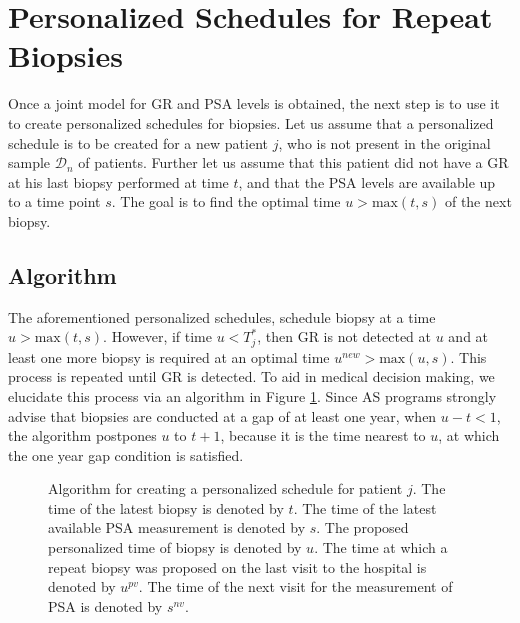 \section{Personalized Schedules for Repeat Biopsies}
\label{sec : pers_sched_approaches}
Once a joint model for GR and PSA levels is obtained, the next step is to use it to create personalized schedules for biopsies. Let us assume that a personalized schedule is to be created for a new patient $j$, who is not present in the original sample $\mathcal{D}_n$ of patients. Further let us assume that this patient did not have a GR at his last biopsy performed at time $t$, and that the PSA levels are available up to a time point $s$. The goal is to find the optimal time $u > \mbox{max}(t,s)$ of the next biopsy. 





\subsection{Algorithm}
\label{subsec : pers_sched_algorithm}
The aforementioned personalized schedules, schedule biopsy at a time $u > \mbox{max}(t,s)$. However, if time $u < T^*_j$, then GR is not detected at $u$ and at least one more biopsy is required at an optimal time $u^{new} > \mbox{max}(u,s)$. This process is repeated until GR is detected. To aid in medical decision making, we elucidate this process via an algorithm in Figure \ref{fig : sched_algorithm}. Since AS programs strongly advise that biopsies are conducted at a gap of at least one year, when $u - t < 1$, the algorithm postpones $u$ to $t + 1$, because it is the time nearest to $u$, at which the one year gap condition is satisfied.


\begin{figure}
\centerline{}
\caption{Algorithm for creating a personalized schedule for patient $j$. The time of the latest biopsy is denoted by $t$. The time of the latest available PSA measurement is denoted by $s$. The proposed personalized time of biopsy is denoted by $u$.  The time at which a repeat biopsy was proposed on the last visit to the hospital is denoted by $u^{pv}$. The time of the next visit for the measurement of PSA is denoted by $s^{nv}$.} 
\label{fig : sched_algorithm}
\end{figure}

